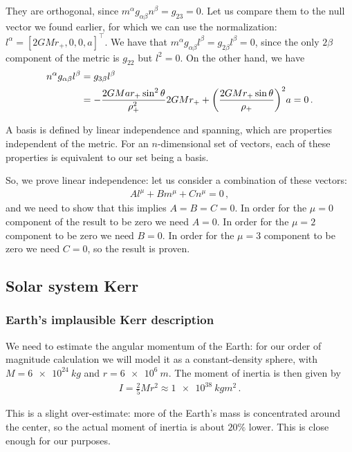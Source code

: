 \documentclass[main.tex]{subfiles}
\begin{document}
They are orthogonal, since \(m^{\alpha } g_{\alpha \beta } n^{\beta } = g_{23} =0 \). 
Let us compare them to the null vector we found earlier, for which we can use the normalization: \(l^{\alpha } = [2GMr_{+}, 0, 0, a]^{\top}\). 
We have that \(m^{\alpha } g_{\alpha \beta } l^{\beta } = g_{2 \beta } l^{\beta }=  0\), since the only \(2 \beta \) component of the metric is \(g_{22 }\) but \(l^{2}=0\). On the other hand, we have 
%
\begin{align}
  n^{\alpha }g_{\alpha \beta } l^{\beta } 
  &= g_{3 \beta } l^{\beta } \\
  &= -\frac{ 2GMar_{+}\sin^2\theta }{\rho_{+}^2} 2GMr_{+}
  + \qty(\frac{2GMr_{+} \sin \theta }{\rho_{+}})^2 a = 0
\,.
\end{align}

A basis is defined by linear independence and spanning, which are properties independent of the metric. For an \(n\)-dimensional set of vectors, each of these properties is equivalent to our set being a basis.

So, we prove linear independence: let us consider a combination of these vectors: 
%
\begin{align}
  A l^{\mu } + B m^{\mu } + C n^{\mu } = 0
\,,
\end{align}
%
and we need to show that this implies \(A = B = C = 0\). 
In order for the \(\mu = 0\) component of the result to be zero we need \(A = 0\). In order for the \(\mu =2\) component to be zero we need \(B = 0\). In order for the \(\mu = 3\) component to be zero we need \(C = 0\), so the result is proven. 

\subsection{Solar system Kerr}

\subsubsection{Earth's implausible Kerr description}

We need to estimate the angular momentum of the Earth: for our order of magnitude calculation we will model it as a constant-density sphere, with \(M = \SI{6e+24}{kg}\) and \(r = \SI{6e6}{m}\). The moment of inertia is then given by 
%
\begin{align}
  I = \frac{2}{5} M r^{2} \approx \SI{1e38}{kg m^2}
\,.
\end{align}

This is a slight over-estimate: more of the Earth's mass is concentrated around the center, so the actual moment of inertia is about \(20\%\) lower. This is close enough for our purposes. 
\end{document}
